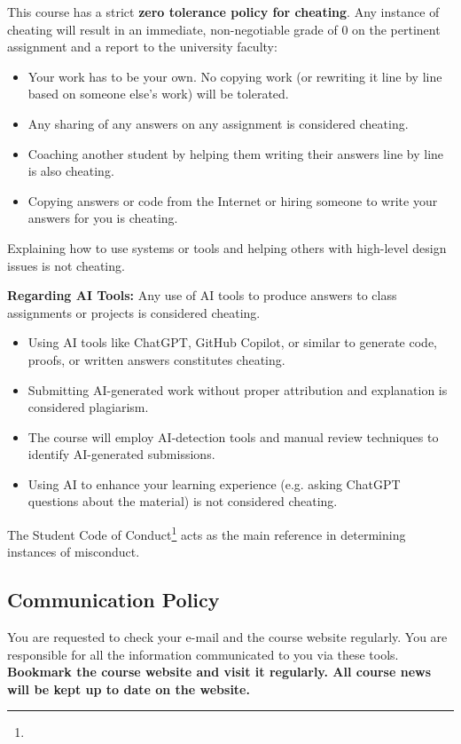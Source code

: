 \documentclass[10pt,a4paper,american]{exam}
\begin{document}
This course has a strict \textbf{zero tolerance policy for cheating}. Any instance of cheating will result in an immediate, non-negotiable grade of 0 on the pertinent assignment and a report to the university faculty:
\begin{itemize}
	\item Your work has to be your own. No copying work (or rewriting it line by line based on someone else's work) will be tolerated.
	\item Any sharing of any answers on any assignment is considered cheating.
	\item Coaching another student by helping them writing their answers line by line is also cheating.
	\item Copying answers or code from the Internet or hiring someone to write your answers for you is cheating.
\end{itemize}

Explaining how to use systems or tools and helping others with high-level design issues is not cheating.

\textbf{Regarding AI Tools:} Any use of AI tools to produce answers to class assignments or projects is considered cheating.
\begin{itemize}
	\item Using AI tools like ChatGPT, GitHub Copilot, or similar to generate code, proofs, or written answers constitutes cheating.
	\item Submitting AI-generated work without proper attribution and explanation is considered plagiarism.
	\item The course will employ AI-detection tools and manual review techniques to identify AI-generated submissions.
	\item Using AI to enhance your learning experience (e.g. asking ChatGPT questions about the material) is not considered cheating.
\end{itemize}

The Student Code of Conduct\footnote{\urlcodeofconduct} acts as the main reference in determining instances of misconduct.

\subsection{Communication Policy}
You are requested to check your e-mail and the course website regularly. You are responsible for all the information communicated to you via these tools. \textbf{Bookmark the course website and visit it regularly. All course news will be kept up to date on the website.}
\end{document}
